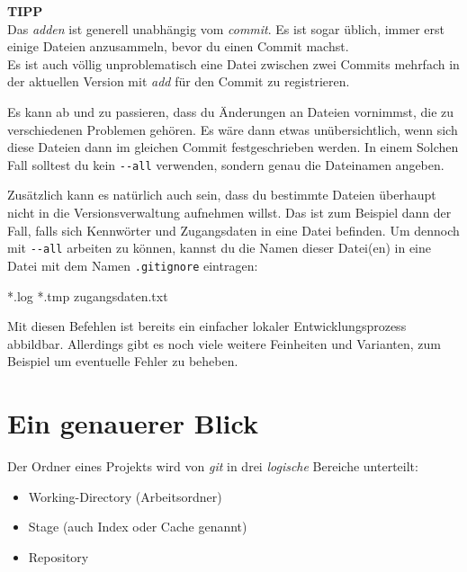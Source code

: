 \documentclass[
  letterpaper,
  DIV=11]{scrreprt}
\newenvironment{Shaded}{\begin{snugshade}}{\end{snugshade}}
\newcommand{\ExtensionTok}[1]{\textcolor[rgb]{0.00,0.23,0.31}{#1}}
\providecommand{\tightlist}{%
  \setlength{\itemsep}{0pt}\setlength{\parskip}{0pt}}\usepackage{longtable,booktabs,array}
\newcommand{\git}{\textit{git}\xspace}
\begin{document}
\samplestart

\textbf{TIPP}\\
Das \emph{adden} ist generell unabhängig vom \emph{commit}. Es ist sogar
üblich, immer erst einige Dateien anzusammeln, bevor du einen Commit
machst.\\
Es ist auch völlig unproblematisch eine Datei zwischen zwei Commits
mehrfach in der aktuellen Version mit \emph{add} für den Commit zu
registrieren.

Es kann ab und zu passieren, dass du Änderungen an Dateien vornimmst,
die zu verschiedenen Problemen gehören. Es wäre dann etwas
unübersichtlich, wenn sich diese Dateien dann im gleichen Commit
festgeschrieben werden. In einem Solchen Fall solltest du kein
\texttt{-\/-all} verwenden, sondern genau die Dateinamen angeben.

Zusätzlich kann es natürlich auch sein, dass du bestimmte Dateien
überhaupt nicht in die Versionsverwaltung aufnehmen willst. Das ist zum
Beispiel dann der Fall, falls sich Kennwörter und Zugangsdaten in eine
Datei befinden. Um dennoch mit \texttt{-\/-all} arbeiten zu können,
kannst du die Namen dieser Datei(en) in eine Datei mit dem Namen
\texttt{.gitignore} eintragen:

\begin{Shaded}
\begin{Highlighting}[]
\ExtensionTok{*.log} 
\ExtensionTok{*.tmp} 
\ExtensionTok{zugangsdaten.txt}
\end{Highlighting}
\end{Shaded}

\sampleend

Mit diesen Befehlen ist bereits ein einfacher lokaler
Entwicklungsprozess abbildbar. Allerdings gibt es noch viele weitere
Feinheiten und Varianten, zum Beispiel um eventuelle Fehler zu beheben.

\section{Ein genauerer Blick}\label{ein-genauerer-blick}

Der Ordner eines Projekts wird von \git in drei \emph{logische} Bereiche
unterteilt:

\begin{itemize}
\tightlist
\item
  Working-Directory (Arbeitsordner)
\item
  Stage (auch Index oder Cache genannt)
\item
  Repository
\end{itemize}
\end{document}
